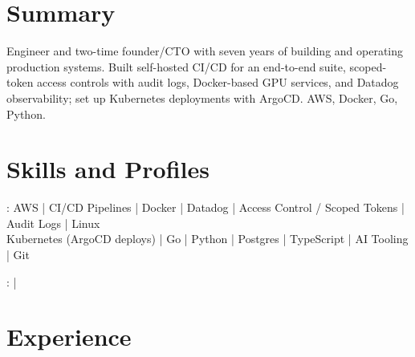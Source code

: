 \documentclass[print]{jack-resume}
\begin{document}
\pagecolor{darkmodeBackground}


\begin{minipage}[t][1cm][t]{.03\textwidth}
    \hfill
\end{minipage}

\section{Summary}
Engineer and two-time founder/CTO with seven years of building and operating production systems. Built self-hosted CI/CD for an end-to-end suite, scoped-token access controls with audit logs, Docker-based GPU services, and Datadog observability; set up Kubernetes deployments with ArgoCD. AWS, Docker, Go, Python.
\sectionsep

\section{Skills and Profiles}
:
AWS \hfill | \hfill
CI/CD Pipelines \hfill | \hfill
Docker \hfill | \hfill
Datadog \hfill | \hfill
Access Control / Scoped Tokens \hfill | \hfill
Audit Logs \hfill | \hfill
Linux \\
\hspace{1.0cm} Kubernetes (ArgoCD deploys) \hfill | \hfill
Go \hfill | \hfill
Python \hfill | \hfill
Postgres \hfill | \hfill
TypeScript \hfill | \hfill
AI Tooling \hfill | \hfill
Git \\

\raggedright{
    :
      \href{https://www.linkedin.com/in/jack-sturtevant/}{ \ExternalLink} |
     \href{https://github.com/jacksturt}{ \ExternalLink}}

\section{Experience}
\end{document}
